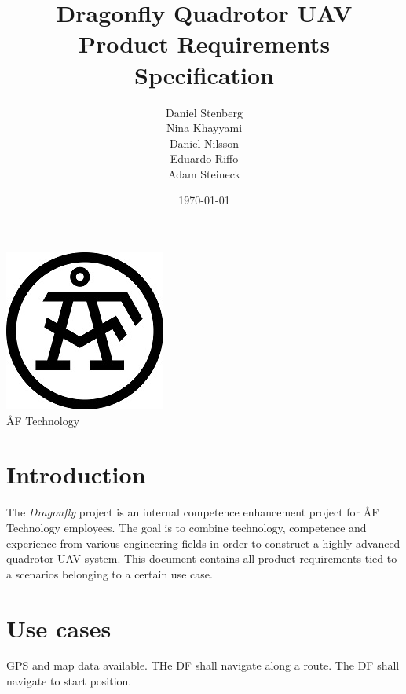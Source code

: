\documentclass[a4paper]{article}
\title{Dragonfly Quadrotor UAV \\ Product Requirements Specification}
\author{Daniel Stenberg \\ Nina Khayyami \\ Daniel Nilsson \\ Eduardo Riffo \\ Adam Steineck}
\date{\today}
\begin{document}

\maketitle                      	%

\begin{center}
\vspace{64pt}
\includegraphics[scale=1.6]{images/AF_Logotype20141_Black.png}
\vspace{16pt}
\\ \large ÅF Technology
\end{center}

\newpage

\tableofcontents				%

\newpage

\section{Introduction}

The \emph{Dragonfly} project is an internal competence enhancement project for ÅF Technology employees. The goal is to combine technology, competence and experience from various engineering fields in order to construct a highly advanced quadrotor UAV system. This document contains all product requirements tied to a scenarios belonging to a certain use case.

\section{Use cases}


 GPS and map data available.
 THe DF shall navigate along a route.
 The DF shall navigate to start position.
\end{document}
